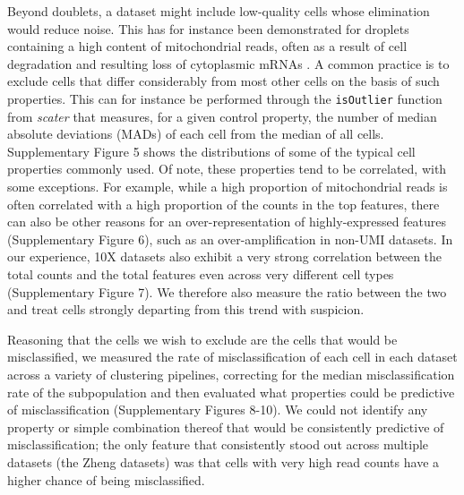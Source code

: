 \documentclass{bmcart}
\begin{document}
Beyond doublets, a dataset might include low-quality cells whose elimination would reduce noise. This has for instance been demonstrated for droplets containing a high content of mitochondrial reads, often as a result of cell degradation and resulting loss of cytoplasmic mRNAs \cite{IlicicLowQual2016}. A common practice is to exclude cells that differ considerably from most other cells on the basis of such properties. This can for instance be performed through the \texttt{isOutlier} function from \textit{scater} that measures, for a given control property, the number of median absolute deviations (MADs) of each cell from the median of all cells. Supplementary Figure 5 shows the distributions of some of the typical cell properties commonly used. Of note, these properties tend to be correlated, with some exceptions. For example, while a high proportion of mitochondrial reads is often correlated with a high proportion of the counts in the top features, there can also be other reasons for an over-representation of highly-expressed features (Supplementary Figure 6), such as an over-amplification in non-UMI datasets. In our experience, 10X datasets also exhibit a very strong correlation between the total counts and the total features even across very different cell types (Supplementary Figure 7). We therefore also measure the ratio between the two and treat cells strongly departing from this trend with suspicion.

Reasoning that the cells we wish to exclude are the cells that would be misclassified, we measured the rate of misclassification of each cell in each dataset across a variety of clustering pipelines, correcting for the median misclassification rate of the subpopulation and then evaluated what properties could be predictive of misclassification (Supplementary Figures 8-10). We could not identify any property or simple combination thereof that would be consistently predictive of misclassification; the only feature that consistently stood out across multiple datasets (the Zheng datasets) was that cells with very high read counts have a higher chance of being misclassified.
\end{document}
